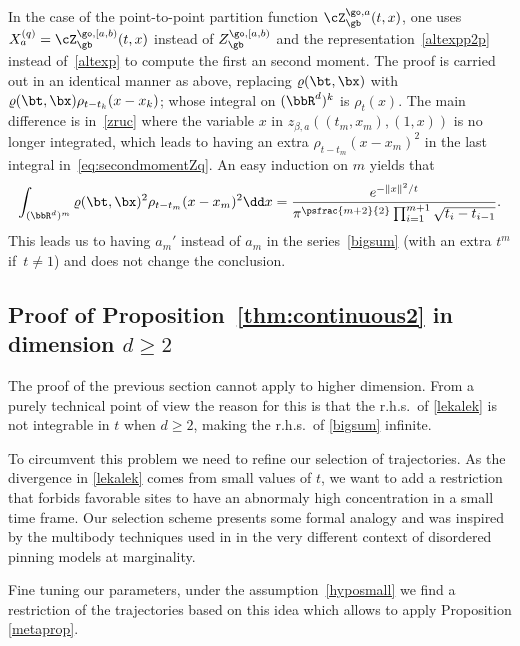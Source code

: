 \begin{rem}
\label{rem:p2p1}
In the case of the point-to-point partition function
$\cZ_{\gb}^{\go,a}(t,x)$,
one uses $X_a^{(q)} = \cZ_{\gb}^{\go,[a,b)}(t,x)$ instead of $Z_{\gb}^{\go, [a,b) }$ and the representation~\eqref{altexpp2p} instead of~\eqref{altexp} to compute the first an second moment.
The proof is carried out in an identical manner as above,
replacing $\varrho(\bt,\bx)$ with $\varrho(\bt,\bx)\rho_{t-t_k}(x-x_k)$;
whose integral on $(\bbR^d)^k$ is $\rho_t(x)$.
The main difference is in~\eqref{zruc} where the variable $x$ in $z_{\beta,a}((t_m,x_m),(1,x))$ is
no longer integrated,
which leads to having an extra $\rho_{t-t_m}(x-x_m)^2$ in the last integral in~\eqref{eq:secondmomentZq}.
An easy induction on $m$ yields that
\begin{equation}\label{inteinte}
\int_{(\bbR^d)^m}
\varrho(\bt,\bx)^2 \rho_{t-t_m}(x-x_m)^2 \dd x=
\frac{e^{-\|x\|^2 / t}}{ \pi^{\psfrac{m+2}{2}} \prod_{i=1}^{m+1} \sqrt {t_i-t_{i-1}}}.
\end{equation}
This leads us to having $ a_m'$ instead of $a_m$ in the series~\eqref{bigsum} (with an extra $t^m$ if~$t\neq 1$) and does not change the conclusion.
\end{rem}

\subsection{Proof of Proposition~\ref{thm:continuous2} in dimension $d\geq 2$}
\label{sec:contd>2}

The proof of the previous section cannot apply to higher dimension. From a purely technical point of view the reason for this is that the r.h.s.\ of \eqref{lekalek} is not integrable in $t$ when $d\ge 2$, making the r.h.s.\ of \eqref{bigsum} infinite.

To circumvent this problem we need to refine our selection of trajectories. As the divergence in \eqref{lekalek} comes from small values of $t$, we want to add a restriction that forbids favorable sites to have an abnormaly high concentration in a small time frame. Our selection scheme presents some formal analogy and was inspired by the multibody techniques used in \cite{BL18, GLT11} in the very different context of disordered pinning models at marginality.

Fine tuning our parameters, under the assumption~\eqref{hyposmall} we find a restriction of the trajectories based on this idea which allows to apply Proposition \ref{metaprop}.

